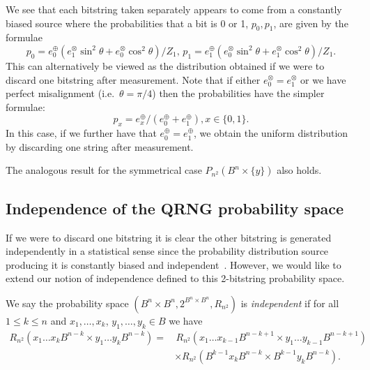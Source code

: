 \documentclass{mscs}
\newtheorem{Definition}[Theorem]{Definition}
\begin{document}
We see that each bitstring taken separately appears to come from a constantly biased source where the probabilities that a bit is 0 or 1, $p_0,p_1$, are given by the formulae
$$p_0 = e_0^\oplus (e_1^\otimes\sin^2\theta+e_0^\otimes\cos^2\theta)/Z_1, \, p_1 = e_1^\oplus (e_0^\otimes\sin^2\theta+e_1^\otimes\cos^2\theta)/Z_1.$$
This can alternatively be viewed as the distribution obtained if we were to discard one bitstring after measurement.
Note that if either $e_0^\otimes = e_1^\otimes$ or we have perfect misalignment (i.e.\ $\theta=\pi/4$) then the probabilities have the simpler formulae: $$p_x=e_x^\oplus/(e_0^\oplus + e_1^\oplus), x\in\{0,1\}.$$ In this case, if we further have that $e_0^\oplus = e_1^\oplus$, we obtain the uniform distribution by discarding one string after measurement.

The analogous result for the symmetrical case $P_{n^2}\left(B^n \times \{y\} \right)$ also holds.

\subsection{Independence of the QRNG probability space}
If we were to discard one bitstring it is clear the other bitstring is generated independently in a statistical sense since the probability distribution source producing it is  constantly biased and independent~\citep{AbbottCalude10}. However, we would like to extend our notion of independence defined \citet{AbbottCalude10} to this 2-bitstring probability space.

	We say the probability space $(B^n\times B^n,2^{B^n\times B^n},R_{n^2})$ is {\it independent} if for all $1\le k \le n$ and $x_1,\dots,x_k$, $y_1,\dots,y_k \in B$ we have
	\begin{align*}
		R_{n^2}(x_1\dots x_k B^{n-k} \times y_1\dots y_k B^{n-k})=& \, R_{n^2}(x_1\dots x_{k-1} B^{n-k+1} \times y_1\dots y_{k-1} B^{n-k+1})\\
		&\times R_{n^2}(B^{k-1}x_k B^{n-k} \times B^{k-1} y_k B^{n-k}).
	\end{align*}
\end{document}
